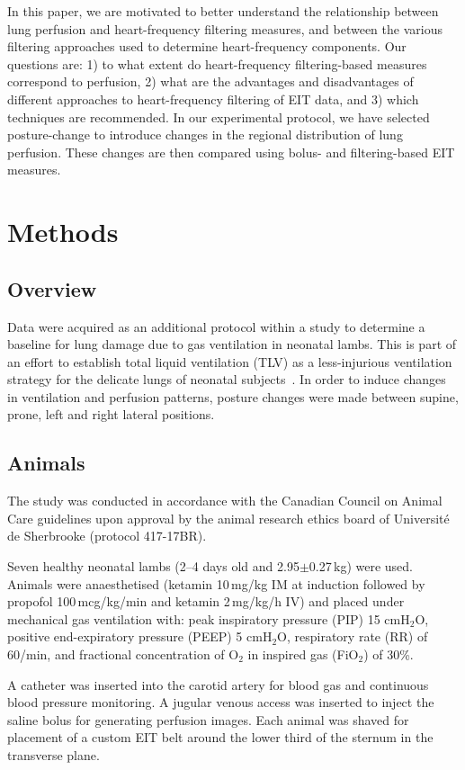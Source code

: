 In this paper, we are motivated to better understand the relationship between
lung perfusion and heart-frequency filtering measures, and between the various filtering
approaches used to determine heart-frequency components. Our questions are:
1) to what extent do heart-frequency filtering-based measures correspond to perfusion,
2) what are the advantages and disadvantages of different approaches
to heart-frequency filtering of EIT data, and 3) which techniques are recommended.
In our experimental protocol, we have selected posture-change 
to introduce changes in the regional distribution of lung perfusion.
These changes are then compared using bolus- and filtering-based
EIT measures.



\section{Methods}
\subsection{Overview}
Data were acquired as an additional protocol within 
a study to determine a baseline for 
lung damage due to gas ventilation in neonatal lambs. 
This is part of an effort to establish total liquid ventilation (TLV) as a less-injurious 
ventilation strategy for the delicate lungs of neonatal 
subjects~\parencite{Sage2018}. In order to induce changes in ventilation 
and perfusion patterns, 
posture changes were made between supine, prone, left and right lateral positions. 


\subsection{Animals}  \label{animals}
The study was conducted in accordance with the Canadian Council 
on Animal Care guidelines upon approval by the animal research ethics 
board of Universit\'e de Sherbrooke (protocol 417-17BR). 

Seven healthy neonatal lambs (2--4
days old and 2.95$\pm$0.27\,kg) were used.
Animals were anaesthetised (ketamin 10\,mg/kg IM at induction followed by 
propofol 100\,mcg/kg/min and ketamin 2\,mg/kg/h IV) and placed 
under mechanical gas ventilation with: peak inspiratory pressure 
(PIP) 15 cmH$_2$O, positive end-expiratory pressure (PEEP) 5 cmH$_2$O, 
respiratory rate (RR) of 60/min, and fractional concentration of O$_2$ in 
inspired gas (FiO$_2$) of 30\%.

A catheter was inserted into the carotid artery for blood gas and 
continuous blood pressure monitoring. A jugular venous access was inserted 
to inject the saline bolus for generating perfusion images. Each 
animal was shaved for placement of a custom EIT belt 
around the lower third of the sternum in the transverse plane.

